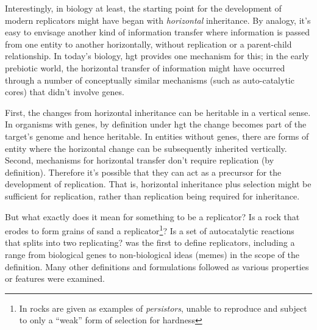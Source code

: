 Interestingly, in biology at least, the starting point for the development of modern replicators might have began with \emph{horizontal} inheritance. By analogy, it’s easy to envisage another kind of information transfer where information is passed from one entity to another horizontally, without replication or a parent-child relationship. In today’s biology, \gls{hgt} provides one mechanism for this; in the early prebiotic world, the horizontal transfer of information might have occurred through a number of conceptually similar mechanisms (such as auto-catalytic cores) that didn’t involve genes. 

First, the changes from horizontal inheritance can be heritable in a vertical sense. In organisms with genes, by definition under \gls{hgt} the change becomes part of the target’s genome and hence heritable. In entities without genes, there are forms of entity where the horizontal change can be subsequently inherited vertically. Second, mechanisms for horizontal transfer don’t require replication (by definition). Therefore it’s possible that they can act as a precursor for the development of replication. That is, horizontal inheritance plus selection might be sufficient for replication, rather than replication being required for inheritance.

But what exactly does it mean for something to be a replicator? Is a rock that erodes to form grains of sand a replicator\footnote{In \textcite{Bourrat2015} rocks are given as examples of \emph{persistors}, unable to reproduce and subject to only a ``weak'' form of selection for hardness}? Is a set of autocatalytic reactions that splits into two replicating? \Textcite{Dawkins1976} was the first to define replicators, including a range from biological genes to non-biological ideas (memes) in the scope of the definition. Many other definitions and formulations followed as various properties or features were examined. 

%
%


